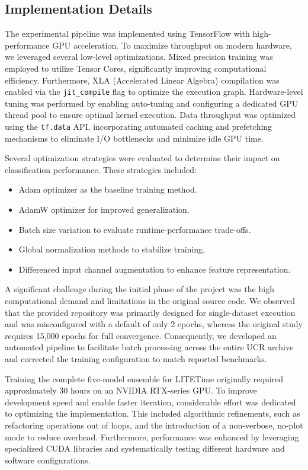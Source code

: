\documentclass[conference]{IEEEtran}
\begin{document}
\subsection{Implementation Details}

The experimental pipeline was implemented using TensorFlow with high-performance GPU acceleration. To maximize throughput on modern hardware, we leveraged several low-level optimizations. Mixed precision training was employed to utilize Tensor Cores, significantly improving computational efficiency. Furthermore, XLA (Accelerated Linear Algebra) compilation was enabled via the \texttt{jit\_compile} flag to optimize the execution graph. Hardware-level tuning was performed by enabling  auto-tuning and configuring a dedicated GPU thread pool to ensure optimal kernel execution. Data throughput was optimized using the \texttt{tf.data} API, incorporating automated caching and prefetching mechanisms to eliminate I/O bottlenecks and minimize idle GPU time.

Several optimization strategies were evaluated to determine their impact on classification performance. These strategies included:

\begin{itemize}

    \item Adam optimizer as the baseline training method.
    \item AdamW optimizer for improved generalization.
    \item Batch size variation to evaluate runtime-performance trade-offs.
    \item Global normalization methods to stabilize training.
    \item Differenced input channel augmentation to enhance feature representation.

\end{itemize}

A significant challenge during the initial phase of the project was the high computational demand and limitations in the original source code. We observed that the provided repository was primarily designed for single-dataset execution and was misconfigured with a default of only 2 epochs, whereas the original study requires 15,000 epochs for full convergence. Consequently, we developed an automated pipeline to facilitate batch processing across the entire UCR archive and corrected the training configuration to match reported benchmarks.

Training the complete five-model ensemble for LITETime originally required approximately 30 hours on an NVIDIA RTX-series GPU. To improve development speed and enable faster iteration, considerable effort was dedicated to optimizing the implementation. This included algorithmic refinements, such as refactoring operations out of loops, and the introduction of a non-verbose, no-plot mode to reduce overhead. Furthermore, performance was enhanced by leveraging specialized CUDA libraries and systematically testing different hardware and software configurations.
\end{document}
